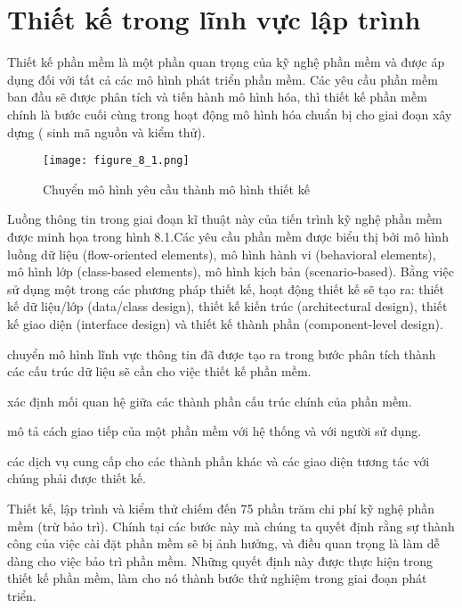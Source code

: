 \documentclass[./../SoftwareEngineering.tex]{subfiles}
\begin{document}
	\section{Thiết kế trong lĩnh vực lập trình}
	Thiết kế phần mềm là một phần quan trọng của kỹ nghệ phần mềm và được áp dụng đối với tất cả các mô hình phát triển phần mềm. Các yêu cầu phần mềm ban đầu sẽ được phân tích và tiến hành mô hình hóa, thì thiết kế phần mềm chính là bước cuối cùng trong hoạt động mô hình hóa chuẩn bị cho giai đoạn xây dựng ( sinh mã nguồn và kiểm thử).

	
	\begin{figure}[htbp]
		\centering
		\texttt{[image: figure\_8\_1.png]}
		\caption{Chuyển mô hình yêu cầu thành mô hình thiết kế}
		\label{ref:fig8_1}
	\end{figure}
	
	Luồng thông tin trong giai đoạn kĩ thuật này của tiến trình kỹ nghệ phần mềm được minh họa trong hình 8.1.Các yêu cầu phần mềm được biểu thị bởi mô hình luồng dữ liệu (flow-oriented elements), mô hình hành vi (behavioral elements), mô hình lớp (class-based elements), mô hình kịch bản (scenario-based). Bằng việc sử dụng một trong các phương pháp thiết kế, hoạt động thiết kế sẽ tạo ra:  thiết kế dữ liệu/lớp (data/class design), thiết kế kiến trúc (architectural design), thiết kế giao diện (interface design) và thiết kế thành phần (component-level design).
	
	
	\begin{description}\itemsep2pt
		\item[Thiết kế dữ liệu/lớp] chuyển mô hình lĩnh vực thông tin đã được tạo ra trong bước phân tích thành các cấu trúc dữ liệu sẽ cần cho việc thiết kế phần mềm. 
		\item[Thiết kế kiến trúc] xác định mối quan hệ giữa các thành phần cấu trúc chính của phần mềm.
		\item[Thiết kế giao diện] mô tả cách giao tiếp của một phần mềm với hệ thống và với người sử dụng. 
		\item[Thiết kế thành phần] các dịch vụ cung cấp cho các thành phần khác và các giao diện tương tác với chúng phải được thiết kế. 
	\end{description}
	
	
	Thiết kế, lập trình và kiểm thử chiếm đến 75 phần trăm chi phí kỹ nghệ phần mềm (trừ bảo trì). Chính tại các bước này mà chúng ta quyết định rằng sự thành công của việc cài đặt phần mềm sẽ bị ảnh hưởng, và điều quan trọng là làm dễ dàng cho việc bảo trì phần mềm. Những quyết định này được thực hiện trong thiết kế phần mềm, làm cho nó thành bước thử nghiệm trong giai đoạn phát triển.
	
\end{document}
